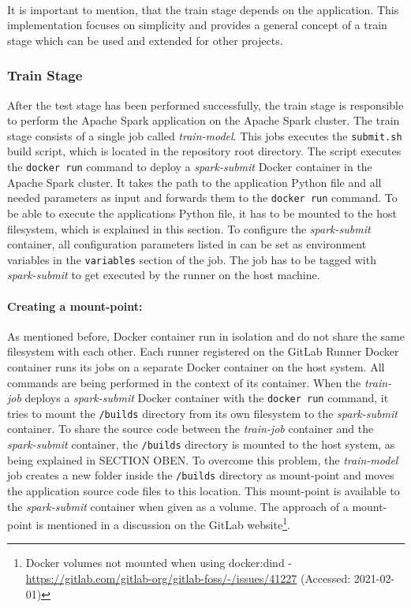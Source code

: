 \paragraph{}
It is important to mention, that the train stage depends on the application. This implementation focuses on simplicity and provides a general concept of a train stage which can be used and extended for other projects.


\subsubsection{Train Stage}
After the test stage has been performed successfully, the train stage is responsible to perform the Apache Spark application on the Apache Spark cluster.
The train stage consists of a single job called \textit{train-model}.
This jobs executes the \texttt{submit.sh} build script, which is located in the repository root directory. The script executes the \texttt{docker run} command to deploy a \textit{spark-submit} Docker container in the Apache Spark cluster. It takes the path to the application Python file and all needed parameters as input and forwards them to the \texttt{docker run} command. To be able to execute the applications Python file, it has to be mounted to the host filesystem, which is explained in this section.
To configure the \textit{spark-submit} container, all configuration parameters listed in  can be set as environment variables in the \texttt{variables} section of the job.
The job has to be tagged with \textit{spark-submit} to get executed by the runner on the host machine.


\paragraph{Creating a mount-point:}
As mentioned before, Docker container run in isolation and do not share the same filesystem with each other.
Each runner registered on the GitLab Runner Docker container runs its jobs on a separate Docker container on the host system. All commands are being performed in the context of its container.
%
When the \textit{train-job} deploys a \textit{spark-submit} Docker container with the \texttt{docker run} command, it tries to mount the \texttt{/builds} directory from its own filesystem to the \textit{spark-submit} container.
%
To share the source code between the \textit{train-job} container and the \textit{spark-submit} container, the \texttt{/builds} directory is mounted to the host system, as being explained in SECTION OBEN.
%
To overcome this problem, the \textit{train-model} job creates a new folder inside the \texttt{/builds} directory as mount-point and moves the application source code files to this location.
%
This mount-point is available to the \textit{spark-submit} container when given as a volume.
%
The approach of a mount-point is mentioned in a discussion on the GitLab website\footnote{Docker volumes not mounted when using docker:dind - \url{https://gitlab.com/gitlab-org/gitlab-foss/-/issues/41227} (Accessed: 2021-02-01)}.
